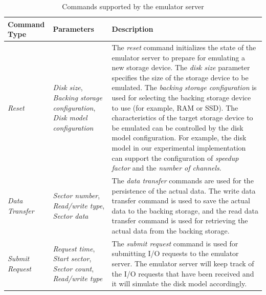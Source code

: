 \begin{table}[htbp]%
	\renewcommand{\arraystretch}{1.3}
	\centering
	\caption{Commands supported by the emulator server}\label{tab:ch6-2}
	\noindent\begin{tabulary}{\dimexpr\textwidth-3.5cm}{|p{3.5cm}|L|J|}
		\hline
		\centering\bfseries Command Type & \centering\bfseries Parameters & \centering\bfseries\arraybackslash Description \\ \hline
		
		\textit{Reset} &
		\textit{Disk size},\vspace{0.5em}\newline
		\textit{Backing storage configuration},\vspace{0.5em}\newline
		\textit{Disk model configuration} &
		The \textit{reset} command initializes the state of the emulator server to prepare for emulating a new storage device. The \textit{disk size} parameter specifies the size of the storage device to be emulated. The \textit{backing storage configuration} is used for selecting the backing storage device to use (for example, RAM or SSD). The characteristics of the target storage device to be emulated can be controlled by the disk model configuration. For example, the disk model in our experimental implementation can support the configuration of \textit{speedup factor} and the \textit{number of channels}. \\ \hline
		
		\textit{Data Transfer} &
		\textit{Sector number},\vspace{0.5em}\newline
		\textit{Read/write type},\vspace{0.5em}\newline
		\textit{Sector data} &
		The \textit{data transfer} commands are used for the persistence of the actual data. The write data transfer command is used to save the actual data to the backing storage, and the read data transfer command is used for retrieving the actual data from the backing storage. \\ \hline
		
		\textit{Submit Request} &
		\textit{Request time},\vspace{0.5em}\newline
		\textit{Start sector},\vspace{0.5em}\newline
		\textit{Sector count},\vspace{0.5em}\newline
		\textit{Read/write type} &
		The \textit{submit request} command is used for submitting I/O requests to the emulator server. The emulator server will keep track of the I/O requests that have been received and it will simulate the disk model accordingly.\\ \hline
		

\end{tabulary}
\end{table}
